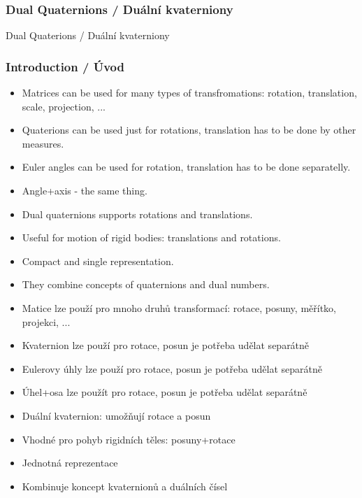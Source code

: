 \begin{frame}
\frametitle{Dual Quaternions / Duální kvaterniony}
\begin{center}
\Huge {\color{white} Dual Quaterions / Duální kvaterniony}
\end{center}
\end{frame}


\begin{frame}\frametitle{Introduction / Úvod}\scriptsize
	\begin{itemize}
	\item Matrices can be used for many types of transfromations: rotation, translation, scale, projection, ...
  \item Quaterions can be used just for rotations, translation has to be done by other measures.
  \item Euler angles can be used for rotation, translation has to be done separatelly.
  \item Angle+axis - the same thing.
  \item Dual quaternions supports rotations and translations.
  \item Useful for motion of rigid bodies: translations and rotations.
  \item Compact and single representation.
  \item They combine concepts of quaternions and dual numbers.
	\end{itemize}

	\begin{itemize}
	\item Matice lze použí pro mnoho druhů transformací: rotace, posuny, měřítko, projekci, ...
  \item Kvaternion lze použí pro rotace, posun je potřeba udělat separátně
  \item Eulerovy úhly lze použí pro rotace, posun je potřeba udělat separátně
  \item Úhel+osa lze použít pro rotace, posun je potřeba udělat separátně
  \item Duální kvaternion: umožňují rotace a posun
  \item Vhodné pro pohyb rigidních těles: posuny+rotace
  \item Jednotná reprezentace
  \item Kombinuje koncept kvaternionů a duálních čísel
	\end{itemize}
\end{frame}

